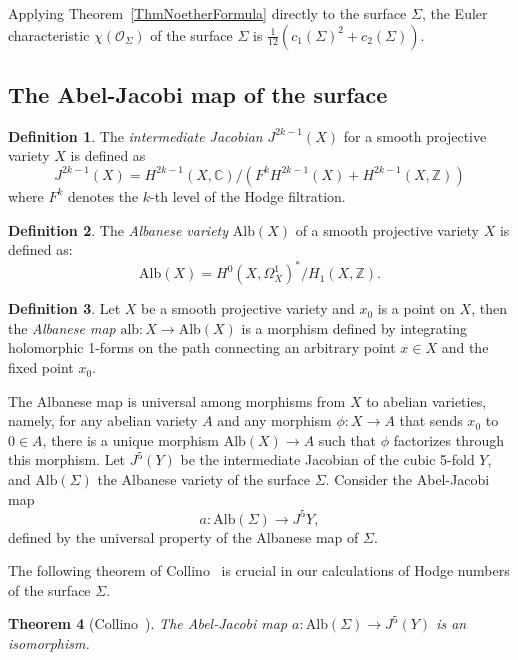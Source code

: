 \documentclass{article}
\newtheorem{theorem}{Theorem}[section]
\theoremstyle{definition}
\newtheorem{definition}[theorem]{Definition}
\begin{document}
Applying Theorem~\ref{ThmNoetherFormula} directly to the surface $\Sigma$, the Euler characteristic $\chi(\mathcal O_\Sigma)$ of the surface $\Sigma$ is $\frac{1}{12}(c_1(\Sigma)^2 + c_2(\Sigma))$.

\subsection{The Abel-Jacobi map of the surface}

\begin{definition}
The \textit{intermediate Jacobian} \( J^{2k - 1}(X) \) for a smooth projective variety \( X \) is defined as
\[
J^{2k - 1}(X) = H^{2k-1}(X, \mathbb{C}) / (F^k H^{2k-1}(X) + H^{2k-1}(X, \mathbb{Z}))
\]
where \( F^k \) denotes the \( k \)-th level of the Hodge filtration.
\end{definition}

\begin{definition}
The \textit{Albanese variety} \( \text{Alb}(X) \) of a smooth projective variety \( X\) is defined as:
\[
\text{Alb}(X) = H^0(X, \Omega^1_X)^* / H_1(X, \mathbb{Z}).
\]
\end{definition}

\begin{definition} Let $X$ be a smooth projective variety and $x_0$ is a point on $X$, then the \textit{Albanese map} \( \mathrm{alb}: X\to \text{Alb}(X) \) is a morphism defined by integrating holomorphic 1-forms on the path connecting an arbitrary point $x\in X$ and the fixed point $x_0$.
\end{definition}
 The Albanese map is universal among morphisms from \( X\) to abelian varieties, namely, for any abelian variety $A$ and any morphism $\phi: X \to A$ that sends $x_0$ to $0\in A$, there is a unique morphism $\mathrm{Alb}(X) \to A$ such that $\phi$ factorizes through this morphism. Let \( J^5(Y) \) be the intermediate Jacobian of the cubic 5-fold \( Y \), and \( \text{Alb}(\Sigma) \) the Albanese variety of the surface \( \Sigma \). Consider the Abel-Jacobi map 
\[
a: \text{Alb}(\Sigma) \to J^5Y,
\]
defined by the universal property of the Albanese map of $\Sigma$.

The following theorem of Collino~\cite{Collino} is crucial in our calculations of Hodge numbers of the surface $\Sigma$.
\begin{theorem}[Collino~\cite{Collino}]\label{ThmCollino}
The Abel-Jacobi map \( a: \text{Alb}(\Sigma) \to J^5(Y) \) is an isomorphism.
\end{theorem}
\end{document}
